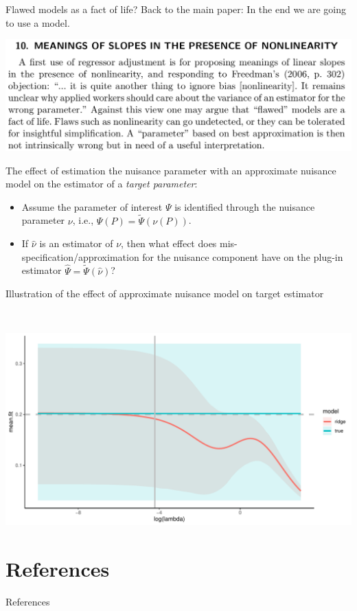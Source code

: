 \documentclass[smaller]{beamer}\usepackage{listings}
\begin{document}
\begin{frame}[label={sec:org35b1e3f}]{Flawed models as a fact of life?}
Back to the main paper: In the end we are going to use a model.
\begin{center}
\includegraphics[width=.9\linewidth]{./quotes/sect10-model-approx.png}
\end{center}

The effect of estimation the nuisance parameter with an approximate nuisance model on the estimator
of a \emph{target parameter}:
\begin{itemize}
\item Assume the parameter of interest \(\Psi\) is identified through the nuisance parameter \(\nu\), i.e.,
\(\Psi(P) = \tilde\Psi(\nu(P))\).
\item If \(\hat \nu\) is an estimator of \(\nu\), then what effect does mis-specification/approximation for
the nuisance component have on the plug-in estimator \(\hat \Psi = \tilde\Psi(\hat \nu)\)?
\end{itemize}
\end{frame}

\begin{frame}[label={sec:org8732e7f}]{\normalsize Illustration of the effect of approximate nuisance model on target estimator}
\begin{block}{$\;$}
\begin{center}
\includegraphics[width=.9\linewidth]{./fig-approximate-nuisance.pdf}
\end{center}
\end{block}
\end{frame}

\section{References}
\label{sec:orga8e3e3b}

\begin{frame}[label={sec:org71d9a1d}]{References}
\small 
\end{frame}
\end{document}
